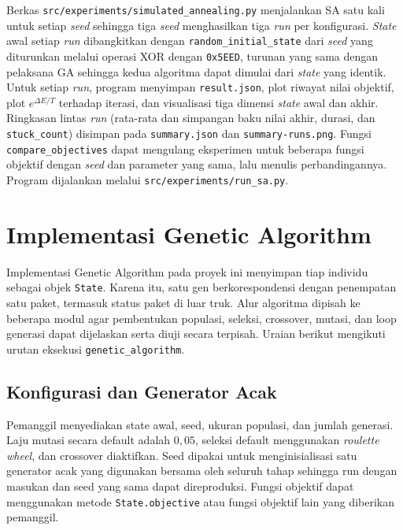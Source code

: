 Berkas \texttt{src/\allowbreak experiments/\allowbreak simulated\_\allowbreak annealing.py} menjalankan SA satu kali untuk setiap \textit{seed} sehingga tiga \textit{seed} menghasilkan tiga \textit{run} per konfigurasi. \textit{State} awal setiap \textit{run} dibangkitkan dengan \texttt{random\_initial\_state} dari \textit{seed} yang diturunkan melalui operasi XOR dengan \texttt{0x5EED}, turunan yang sama dengan pelaksana GA sehingga kedua algoritma dapat dimulai dari \textit{state} yang identik. Untuk setiap \textit{run}, program menyimpan \texttt{result.json}, plot riwayat nilai objektif, plot $e^{\Delta E/T}$ terhadap iterasi, dan visualisasi tiga dimensi \textit{state} awal dan akhir. Ringkasan lintas \textit{run} (rata-rata dan simpangan baku nilai akhir, durasi, dan \texttt{stuck\_count}) disimpan pada \texttt{summary.json} dan \texttt{summary-runs.png}. Fungsi \texttt{compare\_objectives} dapat mengulang eksperimen untuk beberapa fungsi objektif dengan \textit{seed} dan parameter yang sama, lalu menulis perbandingannya. Program dijalankan melalui \texttt{src/\allowbreak experiments/\allowbreak run\_\allowbreak sa.py}.

\section{Implementasi Genetic Algorithm}

Implementasi Genetic Algorithm pada proyek ini menyimpan tiap individu sebagai objek \texttt{State}. Karena itu, satu gen berkorespondensi dengan penempatan satu paket, termasuk status paket di luar truk. Alur algoritma dipisah ke beberapa modul agar pembentukan populasi, seleksi, crossover, mutasi, dan loop generasi dapat dijelaskan serta diuji secara terpisah. Uraian berikut mengikuti urutan eksekusi \texttt{genetic\_algorithm}.

\subsection{Konfigurasi dan Generator Acak}

Pemanggil menyediakan state awal, seed, ukuran populasi, dan jumlah generasi. Laju mutasi secara default adalah $0{,}05$, seleksi default menggunakan \textit{roulette wheel}, dan crossover diaktifkan. Seed dipakai untuk menginisialisasi satu generator acak yang digunakan bersama oleh seluruh tahap sehingga run dengan masukan dan seed yang sama dapat direproduksi. Fungsi objektif dapat menggunakan metode \texttt{State.objective} atau fungsi objektif lain yang diberikan pemanggil.


